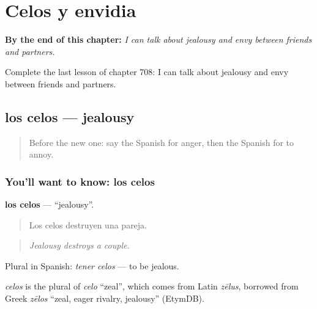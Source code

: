 
\chapter{Celos y envidia}
\label{ch:es-celos-y-envidia}

\begin{chapteropening}
\textbf{By the end of this chapter:} \emph{I can talk about jealousy and envy between friends and partners.}

Complete the last lesson of chapter 708: I can talk about jealousy and envy between friends and partners.
\end{chapteropening}

\section[los celos]{los celos — jealousy}

\label{lesson:ES-C708-celos}



\begin{quote}
Before the new one: say the Spanish for anger, then the Spanish for to annoy.
\end{quote}

\subsection*{You'll want to know: los celos}
\textbf{los celos} — \textquotedblleft{}jealousy\textquotedblright{}.

\begin{quote}
Los celos destruyen una pareja.
\end{quote}

\begin{quote}
\emph{Jealousy destroys a couple.}
\end{quote}

Plural in Spanish: \emph{tener celos} — to be jealous.

\begin{cousinweb}
\emph{celos} is the plural of \emph{celo} \textquotedblleft{}zeal\textquotedblright{}, which comes from Latin \emph{zēlus}, borrowed from Greek \emph{zēlos} \textquotedblleft{}zeal, eager rivalry, jealousy\textquotedblright{} (EtymDB).
\end{cousinweb}

